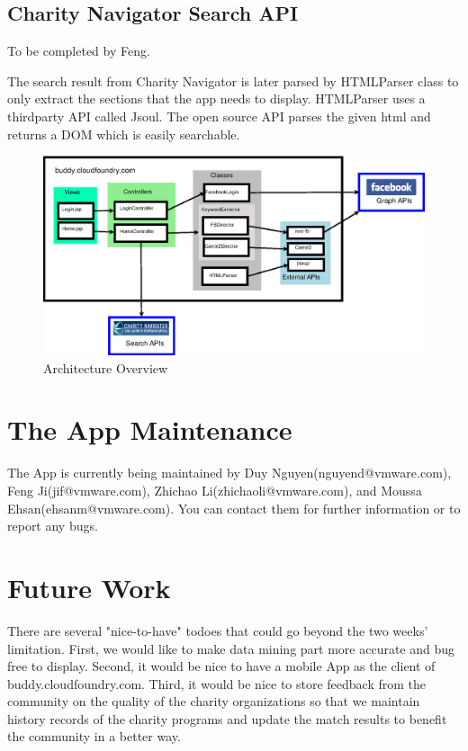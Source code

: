 \documentclass{article}
\begin{document}
\subsection{Charity Navigator Search API}
To be completed by Feng.

The search result from Charity Navigator is later parsed by HTMLParser class to only extract the sections that the app needs to display. HTMLParser uses a thirdparty API called Jsoul. The open source API parses the given html and returns a DOM which is easily searchable. 

\begin{figure}
\centering
\includegraphics[width=6.5in]{./figures/arch-diagram.eps}
\caption{Architecture Overview}\label{fig:arch}
\end{figure}


\section{The App Maintenance}
The App is currently being maintained by Duy Nguyen(nguyend@vmware.com), Feng Ji(jif@vmware.com), Zhichao Li(zhichaoli@vmware.com), and Moussa Ehsan(ehsanm@vmware.com). You can contact them for further information or to report any bugs.

\section{Future Work}
There are several "nice-to-have" todoes that could go beyond the two weeks' limitation.  First, we would like to make data mining part more accurate and bug free to display.  Second, it would be nice to have a mobile App as the client of buddy.cloudfoundry.com. Third, it would be nice to store feedback from the community on the quality of the charity organizations so that we maintain history records of the charity programs and update the match results to benefit the community in a better way. 

%
%
\end{document}
